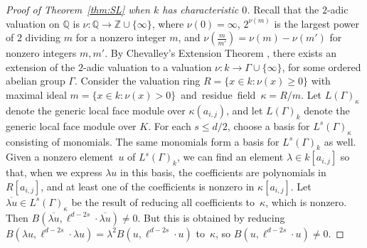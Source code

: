\documentclass[11pt]{article}
\theoremstyle{definition}
\numberwithin{equation}{section}
\def\Z{\mathbb{Z}}
\numberwithin{equation}{section}
\begin{document}
\begin{proof}[Proof of Theorem~\ref{thm:SL} when $k$ has characteristic $0$]
Recall that the $2$-adic valuation on $\mathbb{Q}$ is $\nu \colon \mathbb{Q} \to \Z \cup \{ \infty \}$, where $\nu(0) = \infty$, $2^{\nu(m)}$ is the largest power of $2$ dividing $m$ for a nonzero integer $m$, and $\nu(\frac{m}{m'}) = \nu(m) - \nu(m')$ for nonzero integers $m,m'$. By Chevalley's Extension Theorem \cite[Theorem~3.1.2]{EPValuedFields}, there exists an extension of the  $2$-adic valuation to a valuation $\nu \colon k \to  \Gamma \cup \{ \infty \}$, for some ordered abelian group $\Gamma$. Consider the valuation ring $R = \{ x \in k : \nu(x) \ge 0 \}$ with maximal ideal \mbox{$m = \{ x \in k : \nu(x) > 0 \}$ and  residue field $\kappa = R/m$}. 
Let $L(\Gamma)_{\kappa}$ denote the generic local face module over $\kappa(a_{i,j})$, and let $L(\Gamma)_k$ denote the generic local face module over $K$. For each $s \le d/2$, choose a basis for $L^s(\Gamma)_{\kappa}$ consisting of monomials. The same monomials form a basis for $L^s(\Gamma)_k$ as well. Given a nonzero element~$u$ of $L^s(\Gamma)_k$, we can find an element $\lambda \in k[a_{i,j}]$ so that, when we express $\lambda u$ in this basis, the coefficients are polynomials in $R[a_{i,j}]$, and at least one of the coefficients is nonzero in $\kappa[a_{i,j}]$.
Let $\overline{\lambda u} \in L^s(\Gamma)_{\kappa}$ be the result of reducing all coefficients to~$\kappa$, which is nonzero. Then $B(\overline{\lambda u}, \ell^{d - 2s} \cdot \overline{\lambda u}) \not=0$. But this is obtained by reducing $B(\lambda u, \ell^{d - 2s} \cdot \lambda u) = \lambda^2 B(u, \ell^{d - 2s} \cdot u)$ to~$\kappa$, so $B(u, \ell^{d - 2s} \cdot u) \not= 0$. 
\end{proof}
\end{document}
